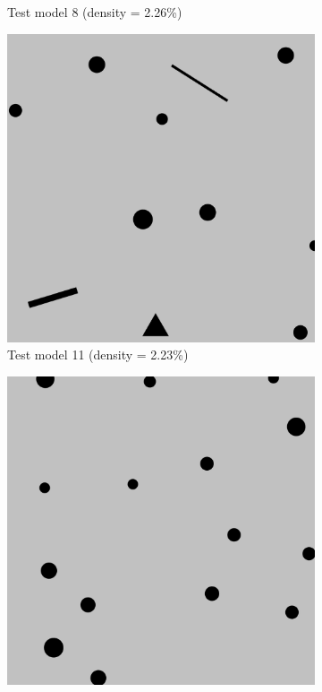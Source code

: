 \documentclass[francais,RandD]{rapportPFE}
\begin{document}
\begin{figure}[h!]
\begin{subfigure}[t]{0.3\linewidth}
					\caption{Test model 8 (density = 2.26\%)}
					\label{fig:test_model_8}
			\end{subfigure}
			\hfill
			\begin{subfigure}[t]{0.3\linewidth}
					\includegraphics[width=\linewidth]{graphics/test_model_11.png}
					\caption{Test model 11 (density = 2.23\%)}
					\label{fig:test_model_11}
			\end{subfigure}
			\hfill
			\begin{subfigure}[t]{0.3\linewidth}
					\includegraphics[width=\linewidth]{graphics/test_model_15.png}

\end{subfigure}
\end{figure}
\end{document}
